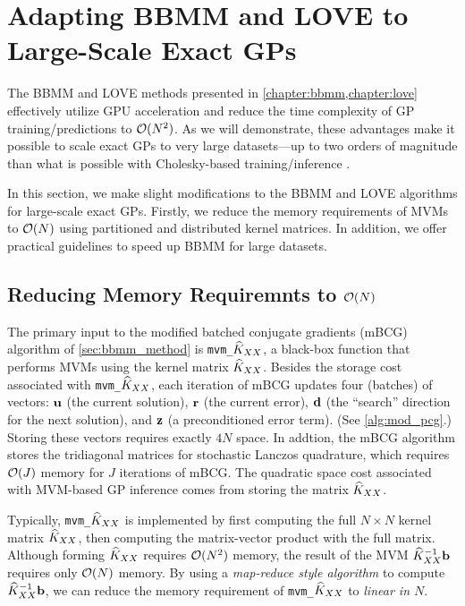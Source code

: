 \section{Adapting BBMM and LOVE to Large-Scale Exact GPs}
\label{sec:largeexact_method}

The BBMM and LOVE methods presented in \cref{chapter:bbmm,chapter:love} effectively utilize GPU acceleration and reduce the time complexity of GP training/predictions to $\bigo{N^2}$.
As we will demonstrate, these advantages make it possible to scale exact GPs to very large datasets---up to two orders of magnitude than what is possible with Cholesky-based training/inference \cite{nguyen2019exact}.

In this section, we make slight modifications to the BBMM and LOVE algorithms for large-scale exact GPs.
Firstly, we reduce the memory requirements of MVMs to $\bigo{N}$ using partitioned and distributed kernel matrices.
In addition, we offer practical guidelines to speed up BBMM for large datasets.




\subsection{Reducing Memory Requiremnts to $\bigo{N}$}

The primary input to the modified batched conjugate gradients (mBCG) algorithm of \cref{sec:bbmm_method} is {\tt mvm\_$\widehat{K}_{XX}$}, a black-box function that performs MVMs using the kernel matrix $\widehat{K}_{XX}$.
Besides the storage cost associated with {\tt mvm\_$\widehat{K}_{XX}$}, each iteration of mBCG updates four (batches) of vectors: $\mathbf{u}$ (the current solution), $\mathbf{r}$ (the current error), $\mathbf{d}$ (the ``search'' direction for the next solution), and $\mathbf{z}$ (a preconditioned error term).
(See \cref{alg:mod_pcg}.)
Storing these vectors requires exactly $4N$ space.
In addtion, the mBCG algorithm stores the tridiagonal matrices for stochastic Lanczos quadrature, which requires $\bigo{J}$ memory for $J$ iterations of mBCG.
The quadratic space cost associated with MVM-based GP inference comes from storing the matrix $\widehat{K}_{XX}$.

Typically, {\tt mvm\_$\widehat{K}_{XX}$} is implemented by first computing the full $N \times N$ kernel matrix $\widehat{K}_{XX}$, then computing the matrix-vector product with the full matrix.
Although forming $\widehat{K}_{XX}$ requires $\bigo{N^2}$ memory, the result of the MVM $\widehat{K}_{XX}^{-1} \mathbf{b}$ requires only $\bigo{N}$ memory.
By using a \emph{map-reduce style algorithm} to compute $\widehat{K}_{XX}^{-1} \mathbf{b}$, we can reduce the memory requirement of {\tt mvm\_$\widehat{K}_{XX}$} to \emph{linear in $N$}.

